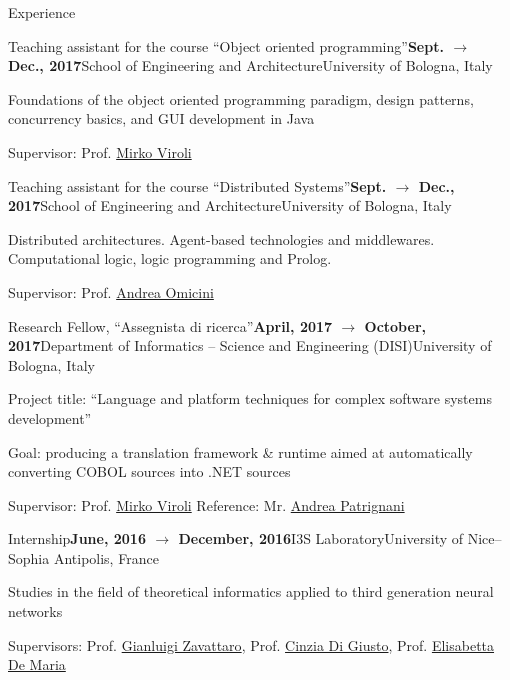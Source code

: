 \documentclass{resume} %
\begin{document}
\begin{rSection}{Experience}
	
\begin{rSubsection}{Teaching assistant for the course ``Object oriented programming''}{\textbf{Sept. $\rightarrow$ Dec., 2017}}{School of Engineering and Architecture}{University of Bologna, Italy}
	\item Foundations of the object oriented programming paradigm, design patterns, concurrency basics, and GUI development in Java
	\item Supervisor: Prof. \href{mailto:mirko.viroli@unibo.it}{Mirko Viroli}
\end{rSubsection}
	
\begin{rSubsection}{Teaching assistant for the course ``Distributed Systems''}{\textbf{Sept. $\rightarrow$ Dec., 2017}}{School of Engineering and Architecture}{University of Bologna, Italy}
	\item Distributed architectures. Agent-based technologies and middlewares. Computational logic, logic programming and Prolog.
	\item Supervisor: Prof. \href{mailto:andrea.omicini@unibo.it}{Andrea Omicini}
\end{rSubsection}
	
\begin{rSubsection}{Research Fellow, ``Assegnista di ricerca''}{\textbf{April, 2017 $\rightarrow$ October, 2017}}{Department of Informatics -- Science and Engineering (DISI)}{University of Bologna, Italy}
	\item Project title: ``Language and platform techniques for complex software systems development''
	\item Goal: producing a translation framework \& runtime aimed at automatically converting COBOL sources into .NET sources 
	\item Supervisor: Prof. \href{mailto:mirko.viroli@unibo.it}{Mirko Viroli} \hfill Reference: Mr. \href{mailto:andrea.patrignani@unibo.it}{Andrea Patrignani}
\end{rSubsection}

\begin{rSubsection}{Internship}{\textbf{June, 2016 $\rightarrow$ December, 2016}}{I3S Laboratory}{University of Nice--Sophia Antipolis, France}
	\item Studies in the field of theoretical informatics applied to third generation neural networks
	\item Supervisors: Prof. \href{mailto:gianluigi.zavattaro@unibo.it}{Gianluigi Zavattaro}, Prof. \href{mailto:cdigiusto@i3s.unice.fr}{Cinzia Di Giusto}, Prof. \href{mailto:elisabetta.de-maria@unice.fr}{Elisabetta De Maria} 
\end{rSubsection}


\end{rSection}
\end{document}
